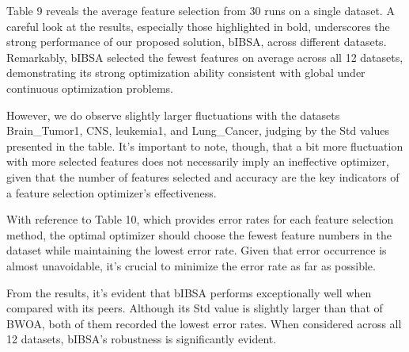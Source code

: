 \documentclass{article} %
\begin{document}
Table 9 reveals the average feature selection from 30 runs on a single dataset. A careful look at the results, especially those highlighted in bold, underscores the strong performance of our proposed solution, bIBSA, across different datasets. Remarkably, bIBSA selected the fewest features on average across all 12 datasets, demonstrating its strong optimization ability consistent with global under continuous optimization problems.

However, we do observe slightly larger fluctuations with the datasets Brain\_Tumor1, CNS, leukemia1, and Lung\_Cancer, judging by the Std values presented in the table. It's important to note, though, that a bit more fluctuation with more selected features does not necessarily imply an ineffective optimizer, given that the number of features selected and accuracy are the key indicators of a feature selection optimizer's effectiveness.

With reference to Table 10, which provides error rates for each feature selection method, the optimal optimizer should choose the fewest feature numbers in the dataset while maintaining the lowest error rate. Given that error occurrence is almost unavoidable, it's crucial to minimize the error rate as far as possible.

From the results, it's evident that bIBSA performs exceptionally well when compared with its peers. Although its Std value is slightly larger than that of BWOA, both of them recorded the lowest error rates. When considered across all 12 datasets, bIBSA's robustness is significantly evident.
\end{document}
